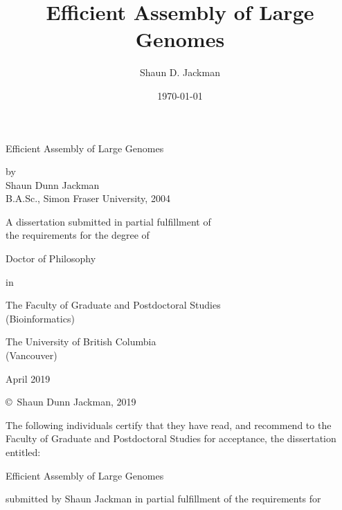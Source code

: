 \documentclass[
  12pt,
  oneside,
  openany]{book}
\title{Efficient Assembly of Large Genomes}
\author{Shaun D. Jackman}
\date{\today{}}
\renewcommand*\listfigurename{List of Figures}
\renewcommand*\listtablename{List of Tables}
\begin{document}
\frontmatter

\mainmatter
\setlength{\cftfignumwidth}{30pt}
\setlength{\cfttabnumwidth}{30pt}
\renewcommand\cftchapdotsep{\cftdotsep}
\renewcommand{\cftmarktoc}{\markboth{}{\hfill \contentsname \hfill}}
\renewcommand{\cftmarklof}{\markboth{}{\hfill \listfigurename \hfill}}
\renewcommand{\cftmarklot}{\markboth{}{\hfill \listtablename \hfill}}
\renewcommand{\chaptermark}[1]{\markboth{}{\hfill \chaptername\ \thechapter.\ #1 \hfill}}

\frontmatter

\thispagestyle{empty}

\begin{center}
\Large

Efficient Assembly of Large Genomes
\vspace{1cm}

by
\\ Shaun Dunn Jackman
\\ B.A.Sc., Simon Fraser University, 2004
\vspace{1cm}

A dissertation submitted in partial fulfillment of
\\ the requirements for the degree of
\vspace{5mm}

Doctor of Philosophy
\vspace{5mm}

in
\vspace{5mm}

The Faculty of Graduate and Postdoctoral Studies
\\ (Bioinformatics)
\vspace{5mm}

The University of British Columbia
\\ (Vancouver)
\vspace{5mm}

April 2019

\vfill
\normalsize
\copyright\ Shaun Dunn Jackman, 2019
\end{center}

\newpage

The following individuals certify that they have read, and recommend to the Faculty of Graduate and Postdoctoral Studies for acceptance, the dissertation entitled: \vspace{5mm}

Efficient Assembly of Large Genomes \vspace{5mm}

submitted by Shaun Jackman in partial fulfillment of the requirements for
\end{document}
